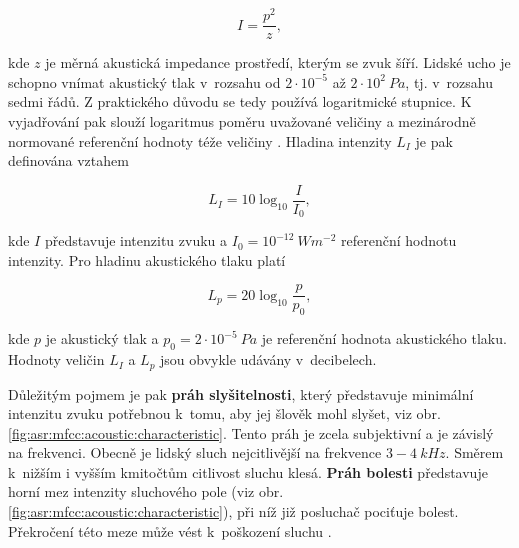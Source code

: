 \begin{equation}
  I = \frac{p^{2}}{z},
  \label{eq:asr:mfcc:intesity}
\end{equation}

\noindent kde $z$ je měrná akustická impedance prostředí, kterým se zvuk šíří. Lidské ucho je schopno vnímat akustický tlak v~rozsahu od $2\cdot10^{-5}$ až $2\cdot10^{2}\ Pa$, tj. v~rozsahu sedmi řádů. Z praktického důvodu se tedy používá logaritmické stupnice. K vyjadřování pak slouží logaritmus poměru uvažované veličiny a mezinárodně normované referenční hodnoty téže veličiny \cite{Psutka2006}. Hladina intenzity $L_{I}$ je pak definována vztahem

\begin{equation}
  L_{I} = 10\log_{10}\frac{I}{I_{0}},
  \label{eq:asr:mfcc:intesity:level}
\end{equation}

\noindent kde $I$ představuje intenzitu zvuku a $I_{0} = 10^{-12}\ Wm^{-2}$ referenční hodnotu intenzity. Pro hladinu akustického tlaku platí

\begin{equation}
  L_{p} = 20\log_{10}\frac{p}{p_{0}},
  \label{eq:asr:mfcc:pressure:level}
\end{equation}

\noindent kde $p$ je akustický tlak a $p_{0} = 2\cdot10^{-5}\ Pa$ je referenční hodnota akustického tlaku. Hodnoty veličin $L_{I}$ a $L_{p}$ jsou obvykle udávány v~decibelech. %

Důležitým pojmem je pak \textbf{práh slyšitelnosti}, který představuje minimální intenzitu zvuku potřebnou  k~tomu, aby jej šlověk mohl slyšet, viz obr. \ref{fig:asr:mfcc:acoustic:characteristic}. Tento práh je zcela subjektivní a je závislý na frekvenci. Obecně je lidský sluch nejcitlivější na frekvence $3 - 4\ kHz$. Směrem  k~nižším i vyšším kmitočtům citlivost sluchu klesá. \textbf{Práh bolesti} představuje horní mez intenzity sluchového pole (viz obr. \ref{fig:asr:mfcc:acoustic:characteristic}), při níž již posluchač pociťuje bolest. Překročení této meze může vést  k~poškození sluchu \cite{Holmes2001}.

